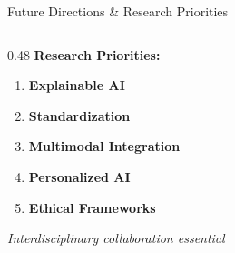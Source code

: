 \documentclass[aspectratio=169]{beamer}
\begin{document}
\begin{frame}{Future Directions \& Research Priorities}
\begin{columns}[T]
    \begin{column}{0.48\textwidth}
      \textbf{Research Priorities:}
      \begin{enumerate}
        \item \textbf{Explainable AI}\\
        
        \item \textbf{Standardization}\\
        
        \item \textbf{Multimodal Integration}\\
        
        \item \textbf{Personalized AI}\\
        
        \item \textbf{Ethical Frameworks}\\
      \end{enumerate}
      
      \vspace{0.3em}
      
      \textit{\small Interdisciplinary collaboration essential}
    \end{column}
  \end{columns}
\end{frame}
\end{document}
